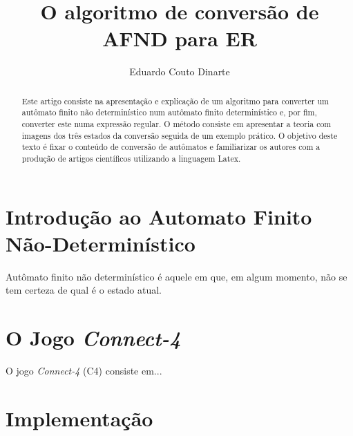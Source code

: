 \documentclass[a4paper,10pt]{article} %
\title{O algoritmo de conversão de AFND para ER}
\author{Eduardo Couto Dinarte}
\begin{document}
\maketitle

\begin{abstract}

    Este artigo consiste na apresenta\c{c}\~{a}o e explica\c{c}\~{a}o de um algoritmo para converter um aut\^{o}mato finito n\~{a}o determin\'{i}stico num aut\^{o}mato finito determin\'{i}stico e, por fim, converter este numa express\~{a}o regular. O m\'{e}todo consiste em apresentar a teoria com imagens dos tr\^{e}s estados da convers\~{a}o seguida de um exemplo pr\'{a}tico. O objetivo deste texto \'{e} fixar o conte\'{u}do de convers\~{a}o de aut\^{o}matos e familiarizar os autores com a produ\c{c}\~{a}o de artigos cient\'{i}ficos utilizando a linguagem Latex.

\end{abstract}


\section{Introdução ao Automato Finito Não-Determinístico}

    Aut\^{o}mato finito n\~{a}o determin\'{i}stico \'{e} aquele em que, em algum momento, n\~{a}o se tem certeza de qual \'{e} o estado atual.


\section{O Jogo \textit{Connect-4}}

O jogo \textit{Connect-4} (C4) consiste em...

\section{Implementação}
\end{document}
